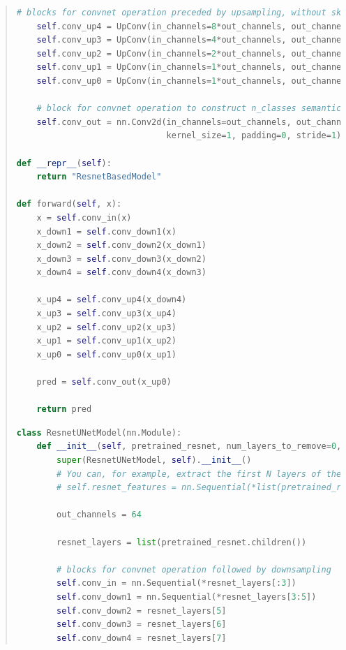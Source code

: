 \documentclass[9pt]{article}
\begin{document}
\begin{quote}
\begin{lstlisting}[language=Python, basicstyle=\scriptsize]
    # blocks for convnet operation preceded by upsampling, without skip connection
    self.conv_up4 = UpConv(in_channels=8*out_channels, out_channels=4*out_channels)
    self.conv_up3 = UpConv(in_channels=4*out_channels, out_channels=2*out_channels)
    self.conv_up2 = UpConv(in_channels=2*out_channels, out_channels=1*out_channels)
    self.conv_up1 = UpConv(in_channels=1*out_channels, out_channels=1*out_channels)
    self.conv_up0 = UpConv(in_channels=1*out_channels, out_channels=1*out_channels)

    # block for convnet operation to construct n_classes semantic outputs
    self.conv_out = nn.Conv2d(in_channels=out_channels, out_channels=n_classes, 
                              kernel_size=1, padding=0, stride=1)

def __repr__(self):
    return "ResnetBasedModel"        

def forward(self, x):
    x = self.conv_in(x)
    x_down1 = self.conv_down1(x)
    x_down2 = self.conv_down2(x_down1)
    x_down3 = self.conv_down3(x_down2)
    x_down4 = self.conv_down4(x_down3)

    x_up4 = self.conv_up4(x_down4)
    x_up3 = self.conv_up3(x_up4)
    x_up2 = self.conv_up2(x_up3)
    x_up1 = self.conv_up1(x_up2)
    x_up0 = self.conv_up0(x_up1)

    pred = self.conv_out(x_up0)

    return pred
\end{lstlisting}

\begin{lstlisting}[language=Python, basicstyle=\scriptsize]
    class ResnetUNetModel(nn.Module):
    def __init__(self, pretrained_resnet, num_layers_to_remove=0, n_classes=9):
        super(ResnetUNetModel, self).__init__()
        # You can, for example, extract the first N layers of the model like this:
        # self.resnet_features = nn.Sequential(*list(pretrained_resnet.children())[:N])
        
        out_channels = 64

        resnet_layers = list(pretrained_resnet.children())

        # blocks for convnet operation followed by downsampling
        self.conv_in = nn.Sequential(*resnet_layers[:3])              
        self.conv_down1 = nn.Sequential(*resnet_layers[3:5])          
        self.conv_down2 = resnet_layers[5]                            
        self.conv_down3 = resnet_layers[6]                            
        self.conv_down4 = resnet_layers[7]                            


\end{lstlisting}
\end{quote}
\end{document}

